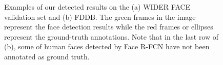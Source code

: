 \documentclass{article} %
\begin{document}
\begin{figure}
  \centering


  \caption{
	Examples of our detected results on the (a) WIDER FACE validation set and (b) FDDB. The green frames in the image represent the face detection results while the red frames or ellipses represent the ground-truth annotations.
Note that in the last row of (b), some of human faces detected by Face R-FCN have not been annotated as ground truth.
    }\label{5}
\end{figure}
\end{document}
